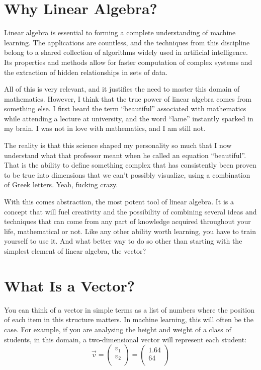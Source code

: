 \documentclass[a4,12pt,twosided,openany]{memoir}
\begin{document}
\chapter{Why Linear Algebra?}
\par 
\indent
Linear algebra is essential to forming a complete understanding of machine learning. The applications are countless, and the techniques from this discipline belong to a shared collection of algorithms widely used in artificial intelligence. Its properties and methods allow for faster computation of complex systems and the extraction of hidden relationships in sets of data. 
\par 
\indent
All of this is very relevant, and it justifies the need to master this domain of mathematics. However, I think that the true power of linear algebra comes from something else. I first heard the term “beautiful” associated with mathematics while attending a lecture at university, and the word “lame” instantly sparked in my brain. I was not in love with mathematics, and I am still not. 
\par 
\indent
The reality is that this science shaped my personality so much that I now understand what that professor meant when he called an equation “beautiful”. That is the ability to define something complex that has consistently been proven to be true into dimensions that we can’t possibly visualize, using a combination of Greek letters. Yeah, fucking crazy. 
\par 
\indent
With this comes abstraction, the most potent tool of linear algebra. It is a concept that will fuel creativity and the possibility of combining several ideas and techniques that can come from any part of knowledge acquired throughout your life, mathematical or not. Like any other ability worth learning, you have to train yourself to use it. And what better way to do so other than starting with the simplest element of linear algebra, the vector?
\chapter{What Is a Vector?}
\par 
\indent
You can think of a vector in simple terms as a list of numbers where the position of each item in this structure matters. In machine learning, this will often be the case. For example, if you are analysing the height and weight of a class of students, in this domain, a two-dimensional vector will represent each student:
\[\overrightarrow{v} = \begin{pmatrix}
 v_1\\
 v_2\\
\end{pmatrix} =  \begin{pmatrix}
 1.64\\
 64\\
\end{pmatrix}\]
\end{document}
